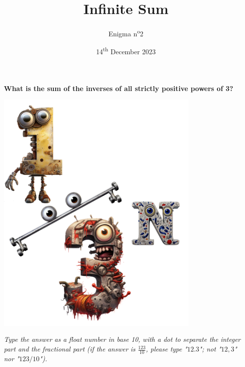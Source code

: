\documentclass[a4paper, top=10mm]{article}
\title{\textbf{\huge{Infinite Sum}}}
\author{Enigma n\textsuperscript{o}2}
\date{14\textsuperscript{th} December 2023}
\begin{document}
	\maketitle
	
	\vspace{2cm}
	
	\Huge{\textbf{What is the sum of the inverses of all strictly positive powers of 3?}}
	
	\vspace{2cm}
	
	\begin{center}
		\includegraphics[height=350pt]{02_one_third_character.png}
	\end{center}
	
	\vspace{2cm}
	
	\normalsize
	\textit{Type the answer as a float number in base 10, with a dot to separate the integer part and the fractional part (if the answer is $\frac{123}{10}$, please type "$12.3$"; not "$12,3$" nor "$123/10$").}
	
	
\end{document}
